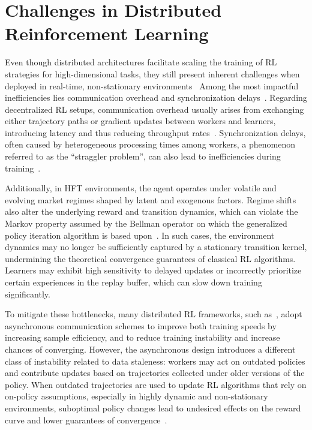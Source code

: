 \section{Challenges in Distributed Reinforcement Learning}
\label{sec:challenges}

Even though distributed architectures facilitate scaling the training of RL strategies for
high-dimensional tasks, they still present inherent challenges when deployed in real-time, non-stationary environments~\citep{He2022, Jia2024}
Among the most impactful inefficiencies lies communication overhead and synchronization delays~\citep{Song2023}.
Regarding decentralized RL setups, communication overhead usually arises from exchanging either trajectory paths or gradient updates
between workers and learners, introducing latency and thus reducing throughput rates~\citep{Espeholt2018}.
Synchronization delays, often caused by heterogeneous processing times among workers, a phenomenon referred to as the ``straggler problem'',
can also lead to inefficiencies during training~\citep{Lu2021}.

Additionally, in HFT environments, the agent operates under volatile and evolving market regimes shaped by latent and exogenous factors.
Regime shifts also alter the underlying reward and transition dynamics, which can violate the Markov property assumed by the Bellman operator
on which the generalized policy iteration algorithm is based upon~\citep{Rabindrajit2024}.
In such cases, the environment dynamics may no longer be sufficiently captured by a stationary transition kernel,
undermining the theoretical convergence guarantees of classical RL algorithms.
Learners may exhibit high sensitivity to delayed updates or incorrectly prioritize certain experiences in the replay buffer,
which can slow down training significantly.

To mitigate these bottlenecks, many distributed RL frameworks, such as~\cite{Espeholt2018, Mnih2016, Paine2019},
adopt asynchronous communication schemes
to improve both training speeds by increasing sample efficiency, and to reduce training instability and increase chances of converging.
However, the asynchronous design introduces a different class of instability related to data staleness:
workers may act on outdated policies and contribute updates based on trajectories collected under older versions of the policy.
When outdated trajectories are used to update RL algorithms that rely on on-policy assumptions,
especially in highly dynamic and non-stationary environments,
suboptimal policy changes lead to undesired effects on the reward curve and lower guarantees of convergence~\citep{Dai2018}.

